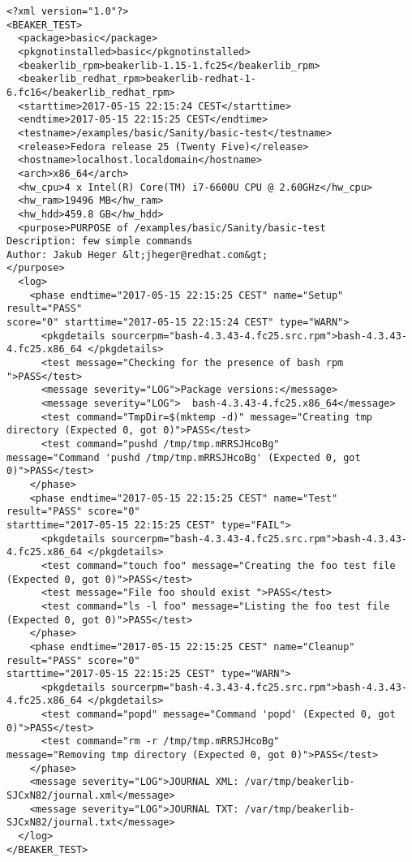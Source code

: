\begin{lstlisting}[style=xml_journal,caption={Example of journal.xml},label={lst:journalxml_example}]
<?xml version="1.0"?>
<BEAKER_TEST>
  <package>basic</package>
  <pkgnotinstalled>basic</pkgnotinstalled>
  <beakerlib_rpm>beakerlib-1.15-1.fc25</beakerlib_rpm>
  <beakerlib_redhat_rpm>beakerlib-redhat-1-6.fc16</beakerlib_redhat_rpm>
  <starttime>2017-05-15 22:15:24 CEST</starttime>
  <endtime>2017-05-15 22:15:25 CEST</endtime>
  <testname>/examples/basic/Sanity/basic-test</testname>
  <release>Fedora release 25 (Twenty Five)</release>
  <hostname>localhost.localdomain</hostname>
  <arch>x86_64</arch>
  <hw_cpu>4 x Intel(R) Core(TM) i7-6600U CPU @ 2.60GHz</hw_cpu>
  <hw_ram>19496 MB</hw_ram>
  <hw_hdd>459.8 GB</hw_hdd>
  <purpose>PURPOSE of /examples/basic/Sanity/basic-test
Description: few simple commands
Author: Jakub Heger &lt;jheger@redhat.com&gt;
</purpose>
  <log>
    <phase endtime="2017-05-15 22:15:25 CEST" name="Setup" result="PASS"
score="0" starttime="2017-05-15 22:15:24 CEST" type="WARN">
      <pkgdetails sourcerpm="bash-4.3.43-4.fc25.src.rpm">bash-4.3.43-4.fc25.x86_64 </pkgdetails>
      <test message="Checking for the presence of bash rpm ">PASS</test>
      <message severity="LOG">Package versions:</message>
      <message severity="LOG">  bash-4.3.43-4.fc25.x86_64</message>
      <test command="TmpDir=$(mktemp -d)" message="Creating tmp directory (Expected 0, got 0)">PASS</test>
      <test command="pushd /tmp/tmp.mRRSJHcoBg" 
message="Command 'pushd /tmp/tmp.mRRSJHcoBg' (Expected 0, got 0)">PASS</test>
    </phase>
    <phase endtime="2017-05-15 22:15:25 CEST" name="Test" result="PASS" score="0" 
starttime="2017-05-15 22:15:25 CEST" type="FAIL">
      <pkgdetails sourcerpm="bash-4.3.43-4.fc25.src.rpm">bash-4.3.43-4.fc25.x86_64 </pkgdetails>
      <test command="touch foo" message="Creating the foo test file (Expected 0, got 0)">PASS</test>
      <test message="File foo should exist ">PASS</test>
      <test command="ls -l foo" message="Listing the foo test file (Expected 0, got 0)">PASS</test>
    </phase>
    <phase endtime="2017-05-15 22:15:25 CEST" name="Cleanup" result="PASS" score="0" 
starttime="2017-05-15 22:15:25 CEST" type="WARN">
      <pkgdetails sourcerpm="bash-4.3.43-4.fc25.src.rpm">bash-4.3.43-4.fc25.x86_64 </pkgdetails>
      <test command="popd" message="Command 'popd' (Expected 0, got 0)">PASS</test>
      <test command="rm -r /tmp/tmp.mRRSJHcoBg" 
message="Removing tmp directory (Expected 0, got 0)">PASS</test>
    </phase>
    <message severity="LOG">JOURNAL XML: /var/tmp/beakerlib-SJCxN82/journal.xml</message>
    <message severity="LOG">JOURNAL TXT: /var/tmp/beakerlib-SJCxN82/journal.txt</message>
  </log>
</BEAKER_TEST>
\end{lstlisting}

